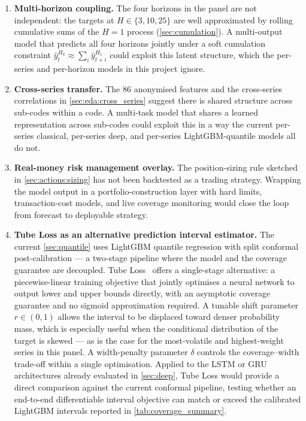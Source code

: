 \begin{enumerate}
  \item \textbf{Multi-horizon coupling.} The four horizons in the panel are not independent: the targets at $H \in \{3, 10, 25\}$ are well approximated by rolling cumulative sums of the $H = 1$ process (\cref{sec:cumulation}). A multi-output model that predicts all four horizons jointly under a soft cumulation constraint $\hat y^{H_k}_t \approx \sum_i \hat y^{H_1}_{t+i}$ could exploit this latent structure, which the per-series and per-horizon models in this project ignore.
  \item \textbf{Cross-series transfer.} The 86 anonymised features and the cross-series correlations in \cref{sec:eda:cross_series} suggest there is shared structure across sub-codes within a code. A multi-task model that shares a learned representation across sub-codes could exploit this in a way the current per-series classical, per-series deep, and per-series LightGBM-quantile models all do not.
  \item \textbf{Real-money risk management overlay.} The position-sizing rule sketched in \cref{sec:actions:sizing} has not been backtested as a trading strategy. Wrapping the model output in a portfolio-construction layer with hard limits, transaction-cost models, and live coverage monitoring would close the loop from forecast to deployable strategy.
  \item \textbf{Tube Loss as an alternative prediction interval estimator.} The current \cref{sec:quantile} uses LightGBM quantile regression with split conformal post-calibration --- a two-stage pipeline where the model and the coverage guarantee are decoupled. Tube Loss~\cite{anand2024tubeloss} offers a single-stage alternative: a piecewise-linear training objective that jointly optimises a neural network to output lower and upper bounds directly, with an asymptotic coverage guarantee and no sigmoid approximation required. A tunable shift parameter $r \in (0,1)$ allows the interval to be displaced toward denser probability mass, which is especially useful when the conditional distribution of the target is skewed --- as is the case for the most-volatile and highest-weight series in this panel. A width-penalty parameter $\delta$ controls the coverage--width trade-off within a single optimisation. Applied to the LSTM or GRU architectures already evaluated in \cref{sec:deep}, Tube Loss would provide a direct comparison against the current conformal pipeline, testing whether an end-to-end differentiable interval objective can match or exceed the calibrated LightGBM intervals reported in \cref{tab:coverage_summary}.
\end{enumerate}

